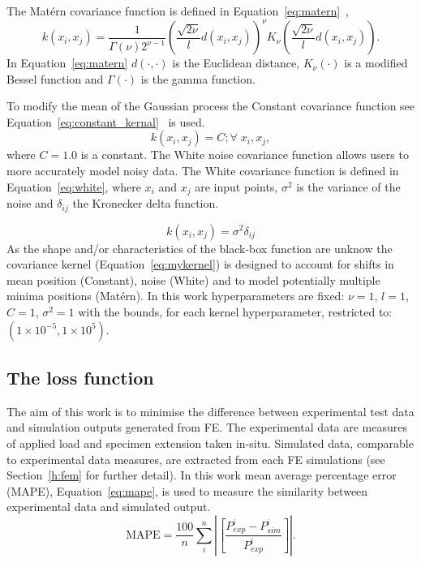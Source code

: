 \documentclass[preprint, review, 12pt]{elsarticle}
\begin{document}
		The Mat\'ern covariance function is defined in Equation~\ref{eq:matern}~\cite{PEDREGOSA2011},
	\begin{equation}
		k(x_i, x_j) = \frac{1}{\Gamma \left( \nu \right)2^{\nu-1}} \left( \frac{\sqrt{2\nu}}{l} d\left( x_i, x_j \right) \right)^{\nu}K_{\nu} \left( \frac{\sqrt{2\nu}}{l} d\left( x_i, x_j \right) \right).
		\label{eq:matern}
	\end{equation}
	In Equation~\ref{eq:matern} $d(\cdot,\cdot)$ is the Euclidean distance, $K_{\nu}\left( \cdot \right)$ is a modified Bessel function and $\Gamma\left( \cdot \right)$ is the gamma function.

	To modify the mean of the Gaussian process the Constant covariance function see Equation~\ref{eq:constant_kernal}~\cite{PEDREGOSA2011} is used.
	\begin{equation}
		k\left( x_i, x_j \right) = C; \forall \; x_i, x_j,
		\label{eq:constant_kernal}
	\end{equation}
	where $C=1.0$ is a constant.
	The White noise covariance function allows users to more accurately model noisy data.
	The White covariance function is defined in Equation~\ref{eq:white}, where $x_i$ and $x_j$ are input points, $\sigma^2$ is the variance of the noise and $\delta_{ij}$ the Kronecker delta function.

	\begin{equation}
		k(x_i, x_j) = \sigma^2 \delta_{ij}
		\label{eq:white}
	\end{equation}
	As the shape and/or characteristics of the black-box function are unknow the covariance kernel (Equation~\ref{eq:mykernel}) is designed to account for shifts in mean position (Constant), noise (White) and to model potentially multiple minima positions (Mat\'ern).
	In this work hyperparameters are fixed: $\nu=1$, $l=1$, $C=1$, $\sigma^2=1$ with the bounds, for each kernel hyperparameter, restricted to: $(1\times10^{-5}, 1\times10^{5})$.

	\subsection{The loss function}
	\label{h:mape_detailed}

	The aim of this work is to minimise the difference between experimental test data and simulation outputs generated from FE.
	The experimental data are measures of applied load and specimen extension taken in-situ.
	Simulated data, comparable to experimental data measures, are extracted from each FE simulations (see Section~\ref{h:fem} for further detail).
	In this work mean average percentage error (MAPE), Equation~\ref{eq:mape}, is used to measure the similarity between experimental data and simulated output.
 	\begin{equation}
	\text{MAPE} = \frac{100}{n} \sum_i^n \left| \left[ \frac{P_{exp}^i - P_{sim}^i}{P_{exp}^i} \right] \right|.
	\label{eq:mape}
	\end{equation}
\end{document}
